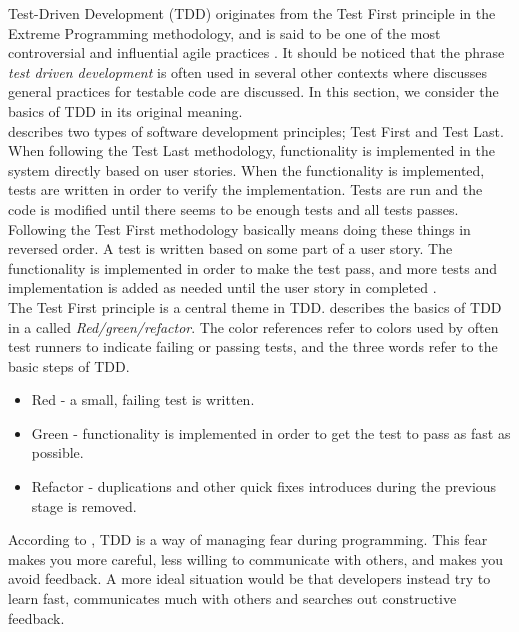 Test-Driven Development (TDD) originates from the Test First principle
in the Extreme Programming methodology, and is said to be one of the
most controversial and influential agile practices
\cite{book:tdd_madeyski}. It should be noticed that the phrase
\emph{test driven development} is often used in several other contexts
where discusses general practices for testable code are discussed. In
this section, we consider the basics of TDD in its original meaning.\\

\citet{book:tdd_madeyski} describes two types of software development
principles; Test First and Test Last. When following the Test Last
methodology, functionality is implemented in the system directly based
on user stories. When the functionality is implemented, tests are
written in order to verify the implementation. Tests are run and the
code is modified until there seems to be enough tests and all tests
passes.\\

Following the Test First methodology basically means doing these things
in reversed order. A test is written based on some part of a user story.
The functionality is implemented in order to make the test pass, and
more tests and implementation is added as needed until the user story in
completed \cite{book:tdd_madeyski}.\\

The Test First principle is a central theme in TDD.
\citet{book:tdd_beck} describes the basics of TDD in a 
called \emph{Red/green/refactor}. The color references refer to colors
used by often test runners to indicate failing or passing tests, and the
three words refer to the basic steps of TDD.

\begin{itemize}
    \item Red - a small, failing test is written.
    \item Green - functionality is implemented in order to get the test
          to pass as fast as possible.
    \item Refactor - duplications and other quick fixes introduces
          during the previous stage is removed.
\end{itemize}

According to \citeauthor{book:tdd_beck}, TDD is a way of managing fear
during programming. This fear makes you more careful, less willing to
communicate with others, and makes you avoid feedback. A more ideal
situation would be that developers instead try to learn fast,
communicates much with others and searches out constructive feedback.\\

